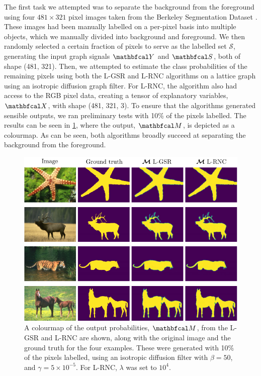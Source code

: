 The first task we attempted was to separate the background from the foreground using four $481 \times 321$ pixel images taken from the Berkeley Segmentation Dataset \citep{Martin2001}. These images had been manually labelled on a per-pixel basis into multiple objects, which we manually divided into background and foreground. We then randomly selected a certain fraction of pixels to serve as the labelled set $\mathcal{S}$, generating the input graph signals $\Yt$ and $\St$, both of shape (481, 321). Then, we attempted to estimate the class probabilities of the remaining pixels using both the L-GSR and L-RNC algorithms on a lattice graph using an isotropic diffusion graph filter. For L-RNC, the algorithm also had access to the RGB pixel data, creating a tensor of explanatory variables, $\Xt$, with shape (481, 321, 3). To ensure that the algorithms generated sensible outputs, we ran preliminary tests with 10\% of the pixels labelled. The results can be seen in \cref{fig:foreground_separation}, where the output, $\Mt$, is depicted as a colourmap. As can be seen, both algorithms broadly succeed at separating the background from the foreground. 


\begin{figure}[t] 
    \begin{center}
        \includegraphics[width=0.8\linewidth]{Figures/segmentation.pdf}
    \end{center}
   \caption[Foreground/background separation with L-GSR and L-RNC]{A colourmap of the output probabilities, $\Mt$, from the L-GSR and L-RNC are shown, along with the original image and the ground truth for the four examples. These were generated with 10\% of the pixels labelled, using an isotropic diffusion filter with $\beta = 50$, and $\gamma = 5 \times 10^{-5}$. For L-RNC, $\lambda$ was set to $10^4$. } 
    \label{fig:foreground_separation}
\end{figure} 

